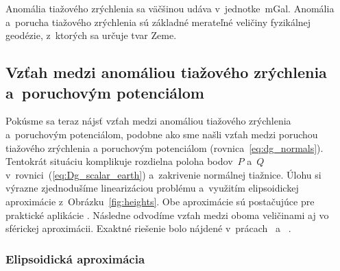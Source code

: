 \documentclass[a4paper,12pt]{book}
\begin{document}
Anomália tiažového zrýchlenia sa väčšinou udáva v~jednotke~mGal.  Anomália 
a~porucha tiažového zrýchlenia sú základné merateľné veličiny fyzikálnej 
geodézie, z~ktorých sa určuje tvar Zeme.

\subsection{Vzťah medzi anomáliou tiažového zrýchlenia a~poruchovým 
potenciálom}

Pokúsme sa teraz nájsť vzťah medzi anomáliou tiažového zrýchlenia a~poruchovým 
potenciálom, podobne ako sme našli vzťah medzi poruchou tiažového zrýchlenia 
a poruchovým potenciálom (rovnica~\ref{eq:dg_normals}).  Tentokrát situáciu 
komplikuje rozdielna poloha bodov~$P$ a~$Q$ 
v~rovnici~(\ref{eq:Dg_scalar_earth}) a~zakrivenie normálnej tiažnice.  Úlohu si 
výrazne zjednodušíme linearizáciou problému a~využitím elipsoidickej 
aproximácie z~Obrázku~\ref{fig:heights}.  Obe aproximácie sú postačujúce pre 
praktické aplikácie \parencite{MoritzAdvancedGeodesy}.  Následne odvodíme vzťah 
medzi oboma veličinami aj vo sférickej aproximácii.  Exaktné riešenie bolo 
nájdené v~prácach~\textcite{Meissl1971b} a~\textcite{Borre_chapter8} 
\parencite[pozri tiež napríklad][]{MoritzAdvancedGeodesy,Janak2006}.

\subsubsection{Elipsoidická aproximácia}
\end{document}
